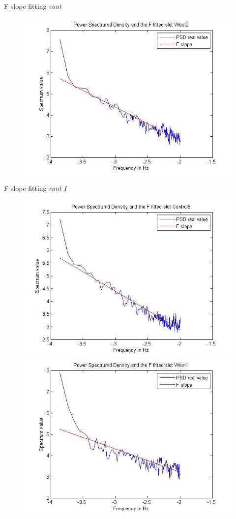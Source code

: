 \documentclass[t,12pt,english
\ifx\beamermode\undefined\else,\beamermode\fi
]{beamer}
\begin{document}
\begin{frame}{F slope fitting \textit{cont}}
\begin{figure}[!htbp]
\includegraphics[width=.7\textwidth]{E41.jpg}\\
\endminipage\hfill
\end{figure}
\end{frame}

\begin{frame}{F slope fitting \textit{cont I}}
\begin{figure}[!htbp]
%
\centering
\includegraphics[width=.7\textwidth]{E37.jpg}\\
\endminipage\hfill
{}%
\centering
\includegraphics[width=.7\textwidth]{E42.jpg}\\
\endminipage\hfill
\end{figure}
\end{frame}
\end{document}
